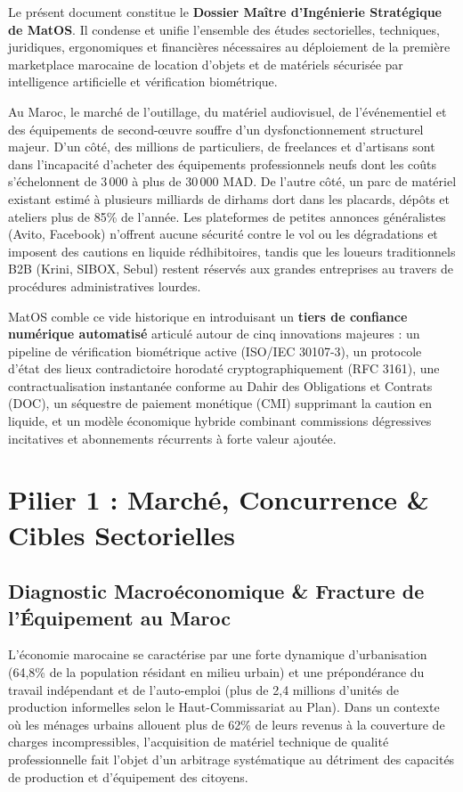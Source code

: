 \documentclass[11pt,a4paper]{report}
\begin{document}
\begin{tcolorbox}[execbox]
Le présent document constitue le \textbf{Dossier Maître d'Ingénierie Stratégique de MatOS}. Il condense et unifie l'ensemble des études sectorielles, techniques, juridiques, ergonomiques et financières nécessaires au déploiement de la première marketplace marocaine de location d'objets et de matériels sécurisée par intelligence artificielle et vérification biométrique.

Au Maroc, le marché de l'outillage, du matériel audiovisuel, de l'événementiel et des équipements de second-œuvre souffre d'un dysfonctionnement structurel majeur. D'un côté, des millions de particuliers, de freelances et d'artisans sont dans l'incapacité d'acheter des équipements professionnels neufs dont les coûts s'échelonnent de 3\,000 à plus de 30\,000 MAD. De l'autre côté, un parc de matériel existant estimé à plusieurs milliards de dirhams dort dans les placards, dépôts et ateliers plus de 85\% de l'année. Les plateformes de petites annonces généralistes (Avito, Facebook) n'offrent aucune sécurité contre le vol ou les dégradations et imposent des cautions en liquide rédhibitoires, tandis que les loueurs traditionnels B2B (Krini, SIBOX, Sebul) restent réservés aux grandes entreprises au travers de procédures administratives lourdes.

MatOS comble ce vide historique en introduisant un \textbf{tiers de confiance numérique automatisé} articulé autour de cinq innovations majeures : un pipeline de vérification biométrique active (ISO/IEC 30107-3), un protocole d'état des lieux contradictoire horodaté cryptographiquement (RFC 3161), une contractualisation instantanée conforme au Dahir des Obligations et Contrats (DOC), un séquestre de paiement monétique (CMI) supprimant la caution en liquide, et un modèle économique hybride combinant commissions dégressives incitatives et abonnements récurrents à forte valeur ajoutée.
\end{tcolorbox}

\chapter{Pilier 1 : Marché, Concurrence \& Cibles Sectorielles}

\section{Diagnostic Macroéconomique \& Fracture de l'Équipement au Maroc}
L'économie marocaine se caractérise par une forte dynamique d'urbanisation (64,8\% de la population résidant en milieu urbain) et une prépondérance du travail indépendant et de l'auto-emploi (plus de 2,4 millions d'unités de production informelles selon le Haut-Commissariat au Plan). Dans un contexte où les ménages urbains allouent plus de 62\% de leurs revenus à la couverture de charges incompressibles, l'acquisition de matériel technique de qualité professionnelle fait l'objet d'un arbitrage systématique au détriment des capacités de production et d'équipement des citoyens.
\end{document}
